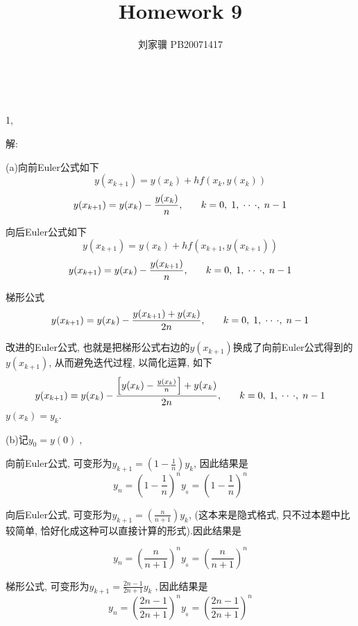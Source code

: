 \documentclass{article}
\begin{document}
\title{Homework 9}

\author{刘家骥 PB20071417}

\maketitle

\

1,

解:

(a)向前Euler公式如下
\[ y (x_{k + 1}) = y (x_k) + h f (x_k, y (x_k)) \]
\[ y (x_{k + 1}) = y (x_k) - \frac{y (x_k) \text{}}{n}, \hspace{1.8em} k = 0,
   \; 1, \; \cdot \cdot \, \cdot, \; n - 1 \]


向后Euler公式如下
\[ y (x_{k + 1}) = y (x_k) + h f (x_{k + 1}, y (x_{k + 1})) \]
\[ y (x_{k + 1}) = y (x_k) - \frac{y (x_{k + 1}) \text{}}{n} \text{},
   \hspace{1.8em} k = 0, \; 1, \; \cdot \cdot \, \cdot, \; n - 1 \]


梯形公式
\[ y (x_{k + 1}) = y (x_k) - \frac{y (x_{k + 1}) + y (x_k) \text{}}{2 n}
   \text{}, \hspace{1.8em} k = 0, \; 1, \; \cdot \cdot \, \cdot, \; n - 1 \]


改进的Euler公式, 也就是把梯形公式右边的$y (x_{k + 1})
$换成了向前Euler公式得到的$y (x_{k + 1})$, 从而避免迭代过程,
以简化运算, 如下
\[ y (x_{k + 1}) = y (x_k) - \frac{\left[ y (x_k) - \frac{y (x_k) \text{}}{n}
   \right] + y (x_k) \text{}}{2 n} \text{}, \hspace{1.8em} k = 0, \; 1, \;
   \cdot \cdot \, \cdot, \; n - 1 \]
$y (x_k) = y_k .$

(b)记$y_0 = y (0) \;,$

向前Euler公式, 可变形为$y_{k + 1} = \left( 1 - \frac{1}{n} \right)
y_k$, 因此结果是
\[ y_n = \left( 1 - \frac{1}{n} \right)^n y_{_0} = \left( 1 - \frac{1}{n}
   \right)^n \]


\begin{flushleft}
  向后Euler公式, 可变形为$y_{k + 1} = \left( \frac{n}{n + 1} \right)
  y_k$, (这本来是隐式格式, 只不过本题中比较简单,
  恰好化成这种可以直接计算的形式).因此结果是
\end{flushleft}
\[ y_n = \left( \frac{n}{n + 1} \right)^n y_{_0} = \left( \frac{n}{n + 1}
   \right)^n \]


梯形公式, 可变形为$y_{k + 1} = \frac{2 n - 1}{2 n + 1} y_k
\;,$因此结果是
\[ y_n = \left( \frac{2 n - 1}{2 n + 1} \right)^n y_{_0} = \left( \frac{2 n -
   1}{2 n + 1} \right)^n \]
\end{document}
